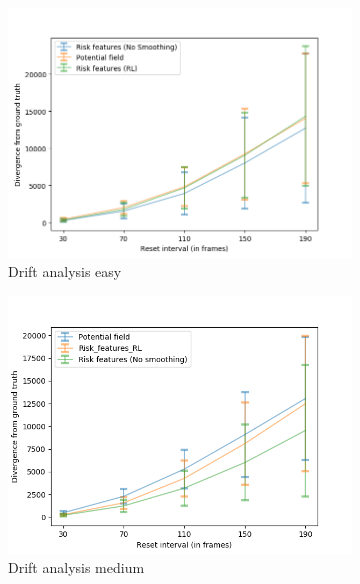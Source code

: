 \begin{figure}[htbp]
	\begin{subfigure}{0.5\textwidth}
		\centering
		\includegraphics[width=\linewidth]{plots/inter_method/drift_analysis_easy.png}
		\caption {Drift analysis easy}
		\label{fig:inter_method-drift_analysis_easy}
	\end{subfigure}
	\begin{subfigure}{0.5\textwidth}
		\centering
		\includegraphics[width=\linewidth]{plots/inter_method/drift_analysis_med.png}
		\caption {Drift analysis medium}
		\label{fig:inter_method-drift_analysis_med}
	\end{subfigure}
	\begin{subfigure}{0.5\textwidth}
		\centering

\end{subfigure}
\end{figure}

